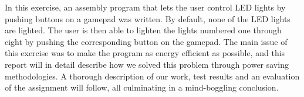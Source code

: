 In this exercise, an assembly program that lets the user control LED lights by pushing buttons on a gamepad was written. By default, none of the LED lights are lighted. The user is then able to lighten the lights numbered one through eight by pushing the corresponding button on the gamepad. The main issue of this exercise was to make the program as energy efficient as possible, and this report will in detail describe how we solved this problem through power saving methodologies. A thorough description of our work, test results and an evaluation of the assignment will follow, all culminating in a mind-boggling conclusion.
